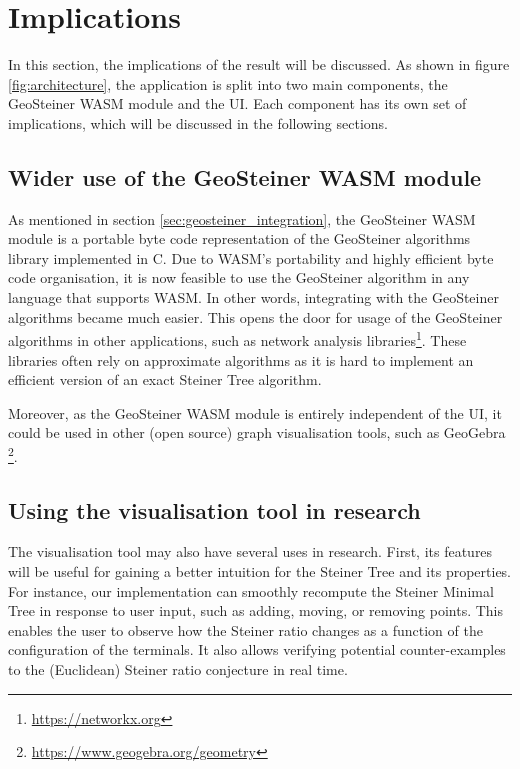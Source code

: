 \documentclass{l4proj}
\begin{document}



\section{Implications}
\label{sec:implications}
In this section, the implications of the result will be discussed. As shown in figure \ref{fig:architecture}, the application is split into two main components, the GeoSteiner WASM module and the UI. Each component has its own set of implications, which will be discussed in the following sections.
\subsection{Wider use of the GeoSteiner WASM module}

As mentioned in section \ref{sec:geosteiner_integration}, the GeoSteiner WASM module is a portable byte code representation of the GeoSteiner algorithms library implemented in C. Due to WASM's portability and highly efficient byte code organisation, it is now feasible to use the GeoSteiner algorithm in any language that supports WASM. In other words, integrating with the GeoSteiner algorithms became much easier. This opens the door for usage of the GeoSteiner algorithms in other applications, such as network analysis libraries\footnote[5]{\url{https://networkx.org}}. These libraries often rely on approximate algorithms as it is hard to implement an efficient version of an exact Steiner Tree algorithm.

Moreover, as the GeoSteiner WASM module is entirely independent of the UI, it could be used in other (open source) graph visualisation tools, such as GeoGebra \footnote[6]{\url{https://www.geogebra.org/geometry}}.
\subsection{Using the visualisation tool in research}
The visualisation tool may also have several uses in research. First, its features will be useful for gaining a better intuition for the Steiner Tree and its properties. For instance, our implementation can smoothly recompute the Steiner Minimal Tree in response to user input, such as adding, moving, or removing points. This enables the user to observe how the Steiner ratio changes as a function of the configuration of the terminals. It also allows verifying potential counter-examples to the (Euclidean) Steiner ratio conjecture in real time.
\end{document}
